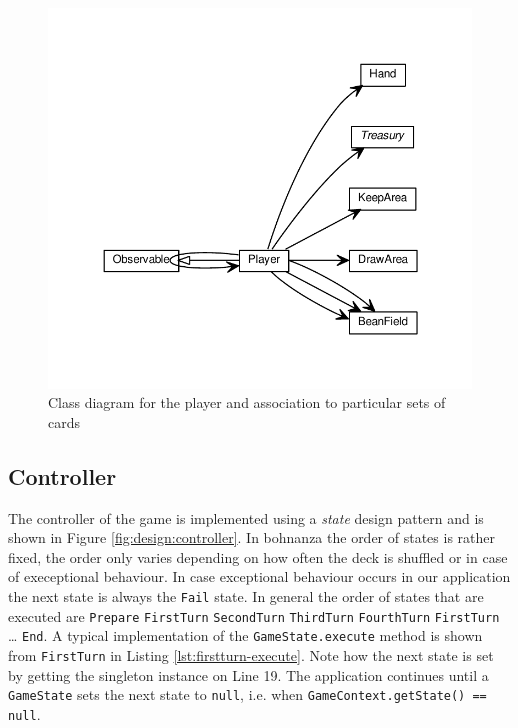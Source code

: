 \begin{figure}[h!] 
    \includegraphics[width=\textwidth]{../umlgraph/PlayerGraph}
    \caption{Class diagram for the player and association to particular sets of cards}
    \label{fig:design:player}
\end{figure}

\newpage
\subsection{Controller}
The controller of the game is implemented using a \emph{state} design pattern and is shown in Figure
\ref{fig:design:controller}. In bohnanza the order of states is rather fixed, the order
only varies depending on how often the deck is shuffled or in case of execeptional behaviour. In case exceptional behaviour occurs in our application the next state is always the
\texttt{Fail} state. In general the order of states that are executed are \texttt{Prepare} \textrightarrow{} \texttt{FirstTurn}
\textrightarrow{} \texttt{SecondTurn} \textrightarrow{} \texttt{ThirdTurn} \textrightarrow{} \texttt{FourthTurn} \textrightarrow{}
\texttt{FirstTurn} \textrightarrow{} \ldots \textrightarrow{} \texttt{End}. A typical implementation of the \texttt{GameState.execute}
method is shown from \texttt{FirstTurn} in Listing \ref{lst:firstturn-execute}. Note how the next state is set by getting the singleton
instance on Line 19.
The application continues until a \texttt{GameState} sets the next state to \texttt{null}, i.e. when \texttt{GameContext.getState() == null}.

